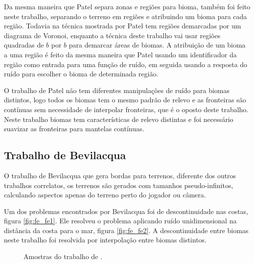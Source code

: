 Da mesma maneira que Patel \cite{patel2010polygonal} separa zonas e regiões para bioma,
também foi feito neste trabalho, separando o terreno em regiões e 
atribuindo um bioma para cada região. Todavia na técnica mostrada por Patel \cite{patel2010polygonal}
tem regiões demarcadas por um diagrama de Voronoi, enquanto a técnica deste trabalho vai 
usar regiões quadradas de $b$ por $b$ para demarcar áreas de biomas.
A atribuição de um bioma a uma região é feito da mesma maneira que Patel \cite{patel2010polygonal}
usando um identificador da região como entrada para uma função de ruído, em seguida
usando a resposta do ruído para escolher o bioma de determinada região.

O trabalho de Patel \cite{patel2010polygonal} não tem diferentes manipulações de ruído
para biomas distintos, logo todos os biomas tem o mesmo padrão de relevo e as 
fronteiras são contínuas sem necessidade de interpolar fronteiras, que é o 
oposto deste trabalho. Neste trabalho biomas tem características de relevo distintas 
e foi necessário suavizar as fronteiras para mantelas contínuas.

\subsection{Trabalho de Bevilacqua}
O trabalho de Bevilacqua \cite{fernando2009costas} que gera bordas para terrenos, diferente dos 
outros trabalhos correlatos, os terrenos são gerados com tamanhos
pseudo-infinitos, calculando aspectos apenas do terreno perto do jogador ou câmera.

Um dos problemas encontrados por Bevilacqua foi de descontinuidade %
nas costas, figura \ref{fig:fe_fe1}. Ele resolveu o problema aplicando ruído unidimensional na distância da costa
para o mar, figura \ref{fig:fe_fe2}. A descontinuidade entre biomas neste trabalho foi resolvida por interpolação 
entre biomas distintos.

\begin{figure}[H]
     \centering
     \hspace{0.1cm}
     \caption{Amostras do trabalho de \cite{fernando2009costas}.}
     \label{fig:fefefefefe}
\end{figure}